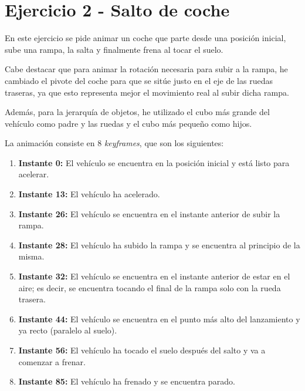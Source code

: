 \documentclass{article}
\begin{document}
\newpage

\section{Ejercicio 2 - Salto de coche}

En este ejercicio se pide animar un coche que parte desde una posición inicial, sube una rampa, la salta y finalmente frena al tocar el suelo.

\bigskip

Cabe destacar que para animar la rotación necesaria para subir a la rampa, he cambiado el pivote del coche para que se sitúe justo en el eje de las ruedas traseras, ya que esto representa mejor el movimiento real al subir dicha rampa.

\bigskip

Además, para la jerarquía de objetos, he utilizado el cubo más grande del vehículo como padre y las ruedas y el cubo más pequeño como hijos.

\bigskip

La animación consiste en 8 \textit{keyframes}, que son los siguientes:

\begin{enumerate}
    \item \textbf{Instante 0:} El vehículo se encuentra en la posición inicial y está listo para acelerar.
    \item \textbf{Instante 13:} El vehículo ha acelerado.
    \item \textbf{Instante 26:} El vehículo se encuentra en el instante anterior de subir la rampa.
    \item \textbf{Instante 28:} El vehículo ha subido la rampa y se encuentra al principio de la misma.
    \item \textbf{Instante 32:} El vehículo se encuentra en el instante anterior de estar en el aire; es decir, se encuentra tocando el final de la rampa solo con la rueda trasera.
    \item \textbf{Instante 44:} El vehículo se encuentra en el punto más alto del lanzamiento y ya recto (paralelo al suelo).
    \item \textbf{Instante 56:} El vehículo ha tocado el suelo después del salto y va a comenzar a frenar.
    \item \textbf{Instante 85:} El vehículo ha frenado y se encuentra parado.
\end{enumerate}

\bigskip
\end{document}
